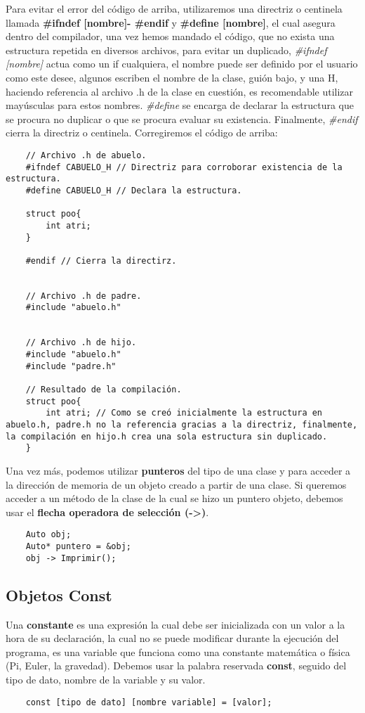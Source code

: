 Para evitar el error del código de arriba, utilizaremos una directriz o centinela llamada \textbf{\#ifndef [nombre]- \#endif} y \textbf{\#define [nombre]}, el cual asegura dentro del compilador, una vez hemos mandado el código, que no exista una estructura repetida en diversos archivos, para evitar un duplicado, \textit{\#ifndef [nombre]} actua como un if cualquiera, el nombre puede ser definido por el usuario como este desee, algunos escriben el nombre de la clase, guión bajo, y una H, haciendo referencia al archivo .h de la clase en cuestión, es recomendable utilizar mayúsculas para estos nombres. \textit{\#define} se encarga de declarar la estructura que se procura no duplicar o que se procura evaluar su existencia. Finalmente, \textit{\#endif} cierra la directriz o centinela. Corregiremos el código de arriba:
\begin{lstlisting}
    // Archivo .h de abuelo.
    #ifndef CABUELO_H // Directriz para corroborar existencia de la estructura.
    #define CABUELO_H // Declara la estructura.
    
    struct poo{
        int atri;
    }
    
    #endif // Cierra la directirz.

    
    // Archivo .h de padre.
    #include "abuelo.h"

    
    // Archivo .h de hijo.
    #include "abuelo.h"
    #include "padre.h"
    
    // Resultado de la compilación.
    struct poo{
        int atri; // Como se creó inicialmente la estructura en abuelo.h, padre.h no la referencia gracias a la directriz, finalmente, la compilación en hijo.h crea una sola estructura sin duplicado.
    }
\end{lstlisting}

Una vez más, podemos utilizar \textbf{punteros} del tipo de una clase y para acceder a la dirección de memoria de un objeto creado a partir de una clase. Si queremos acceder a un método de la clase de la cual se hizo un puntero objeto, debemos usar  el \textbf{flecha operadora de selección (->)}.
\begin{lstlisting}
    Auto obj;
    Auto* puntero = &obj;
    obj -> Imprimir();
\end{lstlisting}


\subsection{Objetos Const}

Una \textbf{constante} es una expresión la cual debe ser inicializada con un valor a la hora de su declaración, la cual no se puede modificar durante la ejecución del programa, es una variable que funciona como una constante matemática o física (Pi, Euler, la gravedad). Debemos usar la palabra reservada \textbf{const}, seguido del tipo de dato, nombre de la variable y su valor.
\begin{lstlisting}
    const [tipo de dato] [nombre variable] = [valor];
\end{lstlisting}

